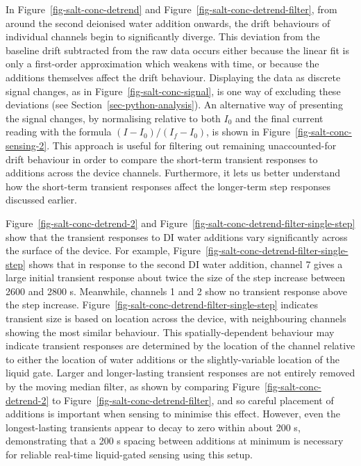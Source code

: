 \documentclass[
  a4paper,
]{scrbook}
\begin{document}
In Figure~\ref{fig-salt-conc-detrend} and
Figure~\ref{fig-salt-conc-detrend-filter}, from around the second
deionised water addition onwards, the drift behaviours of individual
channels begin to significantly diverge. This deviation from the
baseline drift subtracted from the raw data occurs either because the
linear fit is only a first-order approximation which weakens with time,
or because the additions themselves affect the drift behaviour.
Displaying the data as discrete signal changes, as in
Figure~\ref{fig-salt-conc-signal}, is one way of excluding these
deviations (see Section~\ref{sec-python-analysis}). An alternative way
of presenting the signal changes, by normalising relative to both
\(I_{0}\) and the final current reading with the formula
\((I - I_{0})/(I_{f} - I_{0})\), is shown in
Figure~\ref{fig-salt-conc-sensing-2}. This approach is useful for
filtering out remaining unaccounted-for drift behaviour in order to
compare the short-term transient responses to additions across the
device channels. Furthermore, it lets us better understand how the
short-term transient responses affect the longer-term step responses
discussed earlier.

Figure~\ref{fig-salt-conc-detrend-2} and
Figure~\ref{fig-salt-conc-detrend-filter-single-step} show that the
transient responses to DI water additions vary significantly across the
surface of the device. For example,
Figure~\ref{fig-salt-conc-detrend-filter-single-step} shows that in
response to the second DI water addition, channel 7 gives a large
initial transient response about twice the size of the step increase
between 2600 and 2800 s. Meanwhile, channels 1 and 2 show no transient
response above the step increase.
Figure~\ref{fig-salt-conc-detrend-filter-single-step} indicates
transient size is based on location across the device, with neighbouring
channels showing the most similar behaviour. This spatially-dependent
behaviour may indicate transient responses are determined by the
location of the channel relative to either the location of water
additions or the slightly-variable location of the liquid gate. Larger
and longer-lasting transient responses are not entirely removed by the
moving median filter, as shown by comparing
Figure~\ref{fig-salt-conc-detrend-2} to
Figure~\ref{fig-salt-conc-detrend-filter}, and so careful placement of
additions is important when sensing to minimise this effect. However,
even the longest-lasting transients appear to decay to zero within about
200 s, demonstrating that a 200 s spacing between additions at minimum
is necessary for reliable real-time liquid-gated sensing using this
setup.
\end{document}
